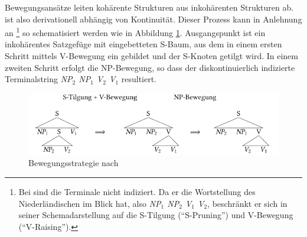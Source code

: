 Bewegungsansätze leiten kohärente Strukturen aus inkohärenten Strukturen ab.  ist also derivationell abhängig von Kontinuität. Dieser Prozess kann in Anlehnung an \citet[(1)]{Evers:75}\footnote{Bei \citet[(1)]{Evers:75} sind die Terminale nicht indiziert. Da er die Wortstellung des Niederländischen im Blick hat, also {\it NP$_1$ NP$_2$ V$_1$ V$_2$}, beschränkt er sich in seiner Schemadarstellung auf die S-Tilgung ("`S-Pruning"') und V-Bewegung ("`V-Raising"').} so schematisiert werden wie in Abbildung \ref{fig-ttmctag-kohaerenz-1}. Ausgangspunkt ist ein inkohärentes Satzgefüge mit eingebetteten S-Baum, aus dem in einem ersten Schritt mittels V-Bewegung ein  gebildet und der S-Knoten getilgt wird. In einem zweiten Schritt erfolgt die NP-Bewegung, so dass der diskontinuierlich indizierte Terminalstring {\it NP$_2$ NP$_1$ V$_2$ V$_1$} resultiert.  

\begin{figure}
\centering
\includegraphics{graphics/abb62.pdf}
\caption{\label{fig-ttmctag-kohaerenz-1}Bewegungsstrategie nach \citet[(1a), (1b)]{Evers:75}}
\end{figure}

